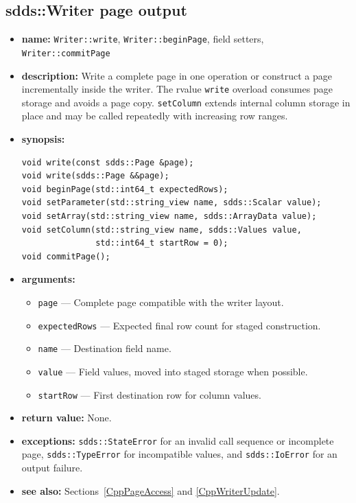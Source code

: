 \documentclass[11pt]{article}
\begin{document}
\subsection{sdds::Writer page output}
\label{CppWriterPages}

\begin{itemize}
\item {\bf name:}\newline
{\tt Writer::write}, {\tt Writer::beginPage}, field setters,
{\tt Writer::commitPage}
\item {\bf description:}\newline
Write a complete page in one operation or construct a page incrementally inside
the writer.  The rvalue {\tt write} overload consumes page storage and avoids a
page copy.  {\tt setColumn} extends internal column storage in place and may be
called repeatedly with increasing row ranges.
\item {\bf synopsis:}
\begin{verbatim}
void write(const sdds::Page &page);
void write(sdds::Page &&page);
void beginPage(std::int64_t expectedRows);
void setParameter(std::string_view name, sdds::Scalar value);
void setArray(std::string_view name, sdds::ArrayData value);
void setColumn(std::string_view name, sdds::Values value,
               std::int64_t startRow = 0);
void commitPage();
\end{verbatim}
\item {\bf arguments:}
\begin{itemize}
\item {\tt page} --- Complete page compatible with the writer layout.
\item {\tt expectedRows} --- Expected final row count for staged construction.
\item {\tt name} --- Destination field name.
\item {\tt value} --- Field values, moved into staged storage when possible.
\item {\tt startRow} --- First destination row for column values.
\end{itemize}
\item {\bf return value:}\newline
None.
\item {\bf exceptions:}\newline
{\tt sdds::StateError} for an invalid call sequence or incomplete page,
{\tt sdds::TypeError} for incompatible values, and {\tt sdds::IoError} for an
output failure.
\item {\bf see also:}\newline
Sections~\ref{CppPageAccess} and \ref{CppWriterUpdate}.
\end{itemize}
\end{document}
